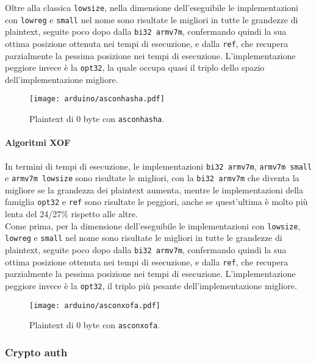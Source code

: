 \noindent Oltre alla classica \texttt{lowsize}, nella dimensione dell'eseguibile le implementazioni con \texttt{lowreg} e \texttt{small} nel nome sono risultate le migliori in tutte le grandezze di plaintext, seguite poco dopo dalla \texttt{bi32 armv7m}, confermando quindi la sua ottima posizione ottenuta nei tempi di esecuzione, e dalla \texttt{ref}, che recupera parzialmente la pessima posizione nei tempi di esecuzione. L'implementazione peggiore invece è la \texttt{opt32}, la quale occupa quasi il triplo dello spazio dell'implementazione migliore.

\begin{figure}[H]
    \centering
    \texttt{[image: arduino/asconhasha.pdf]}
    \caption{Plaintext di 0 byte con \texttt{asconhasha}.}
\end{figure}

\paragraph{Algoritmi XOF}

In termini di tempi di esecuzione, le implementazioni \texttt{bi32 armv7m}, \texttt{armv7m small} e \texttt{armv7m lowsize} sono risultate le migliori, con la \texttt{bi32 armv7m} che diventa la migliore se la grandezza dei plaintext aumenta, mentre le implementazioni della famiglia \texttt{opt32} e \texttt{ref} sono risultate le peggiori, anche se quest'ultima è molto più lenta del 24/27\% rispetto alle altre. \\

\noindent Come prima, per la dimensione dell'eseguibile le implementazioni con \texttt{lowsize}, \texttt{lowreg} e \texttt{small} nel nome sono risultate le migliori in tutte le grandezze di plaintext, seguite poco dopo dalla \texttt{bi32 armv7m}, confermando quindi la sua ottima posizione ottenuta nei tempi di esecuzione, e dalla \texttt{ref}, che recupera parzialmente la pessima posizione nei tempi di esecuzione. L'implementazione peggiore invece è la \texttt{opt32}, il triplo più pesante dell'implementazione migliore.

\begin{figure}[H]
    \centering
    \texttt{[image: arduino/asconxofa.pdf]}
    \caption{Plaintext di 0 byte con \texttt{asconxofa}.}
\end{figure}

\subsubsection{Crypto auth}

